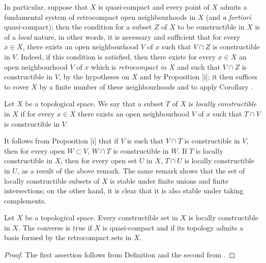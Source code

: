 \begin{env}[9.1.10]
\label{0.9.1.10}
In particular, suppose that $X$ is quasi-compact and every point
of $X$ admits a fundamental system of retrocompact open neighbourhoods in $X$ (and \emph{a fortiori} quasi-compact); then the condition for a subset $Z$ of $X$ to be constructible in $X$ is of a \emph{local} nature, in other words, it is necessary and sufficient that for every $x\in X$, there exists an open neighbourhood $V$ of $x$ such that $V\cap Z$ is constructible in $V$.
Indeed, if this condition is satisfied, then there exists for every $x\in X$ an open neighbourhood $V$ of $x$ which is \emph{retrocompact in $X$} and such that $V\cap Z$ is constructible in $V$, by the hypotheses on $X$ and by Proposition [i]; it then suffices to cover $X$ by a finite number of these neighbourhoods and to apply Corollary .
\end{env}

\begin{definition}[9.1.11]
\label{0.9.1.11}
Let $X$ be a topological space.
We say that a subset $T$ of $X$ is \emph{locally constructible} in $X$ if for every $x\in X$ there exists an open neighbourhood $V$ of $x$ such that $T\cap V$ is constructible in $V$.
\end{definition}

It follows from Proposition [i] that if $V$ is such that $V\cap T$ is constructible in $V$, then for every open $W\subset V$, $W\cap T$ is constructible in $W$.
If $T$ is locally constructible in $X$, then for every open set $U$ in $X$, $T\cap U$ is locally constructible in $U$, as a result of the above remark.
The same remark shows that the set of locally constructible subsets of $X$ is stable under finite unions and finite intersections; on the other hand, it is clear that it is also stable under taking complements.

\begin{proposition}[9.1.12]
\label{0.9.1.12}
Let $X$ be a topological space.
Every constructible set in $X$ is locally constructible in $X$.
The converse is true if $X$ is quasi-compact and if its topology admits a basis formed by the retrocompact sets in $X$.
\end{proposition}

\begin{proof}
The first assertion follows from Definition  and the second from .
\end{proof}

